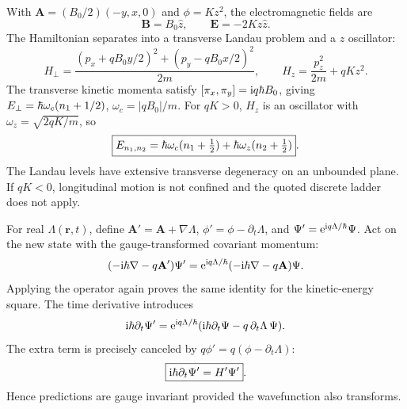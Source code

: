 With $\mathbf A=(B_0/2)(-y,x,0)$
and $\phi=Kz^2$, the electromagnetic fields are
\begin{equation}
\boxed{\mathbf B=B_0\hat z,\qquad
\mathbf E=-2Kz\hat z}.
\end{equation}
The Hamiltonian separates into a transverse
Landau problem and a $z$ oscillator:
\begin{equation}
H_\perp=\frac{(p_x+qB_0y/2)^2+
(p_y-qB_0x/2)^2}{2m},\qquad
H_z=\frac{p_z^2}{2m}+qKz^2.
\end{equation}
The transverse kinetic momenta satisfy
$[\pi_x,\pi_y]=\mathrm i q\hbar B_0$, giving
$E_\perp=\hbar\omega_c(n_1+1/2)$,
$\omega_c=|qB_0|/m$.
For $qK>0$,
$H_z$ is an oscillator with
$\omega_z=\sqrt{2qK/m}$, so
\begin{equation}
\boxed{E_{n_1,n_2}=
\hbar\omega_c(n_1+\tfrac12)+
\hbar\omega_z(n_2+\tfrac12)}.
\end{equation}
The Landau levels have extensive transverse
degeneracy on an unbounded plane.
If $qK<0$, longitudinal motion is not
confined and the quoted discrete ladder does
not apply.

For real $\Lambda(\mathbf r,t)$, define
$\mathbf A'=\mathbf A+\nabla\Lambda$,
$\phi'=\phi-\partial_t\Lambda$,
and $\Psi'=\mathrm e^{\mathrm i q\Lambda/\hbar}\Psi$.
Act on the new state with the
gauge-transformed covariant momentum:
\begin{equation}
(-\mathrm i\hbar\nabla-q\mathbf A')\Psi'
=\mathrm e^{\mathrm i q\Lambda/\hbar}
(-\mathrm i\hbar\nabla-q\mathbf A)\Psi.
\end{equation}
Applying the operator again proves the same
identity for the kinetic-energy square.
The time derivative introduces
\begin{equation}
\mathrm i\hbar\partial_t\Psi'
=\mathrm e^{\mathrm i q\Lambda/\hbar}
(\mathrm i\hbar\partial_t\Psi-
q\,\partial_t\Lambda\,\Psi).
\end{equation}
The extra term is precisely canceled by
$q\phi'=q(\phi-\partial_t\Lambda)$:
\begin{equation}
\boxed{\mathrm i\hbar\partial_t\Psi'=H'\Psi'}.
\end{equation}
Hence predictions are gauge invariant
provided the wavefunction also transforms.

